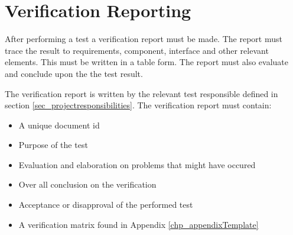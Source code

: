 \chapter{Verification Reporting}
\label{chp:verificationReporting}

After performing a test a verification report must be made. The report must trace the result to requirements, component, interface and other relevant elements. This must be written in a table form. The report must also evaluate and conclude upon the the test result.

The verification report is written by the relevant test responsible defined in section \ref{sec_projectresponsibilities}. The verification report must contain:

\begin{itemize}
	\item A unique document id
	\item Purpose of the test
	\item Evaluation and elaboration on problems that might have occured
	\item Over all conclusion on the verification
	\item Acceptance or disapproval of the performed test
	\item A verification matrix found in Appendix \ref{chp_appendixTemplate}
\end{itemize}
